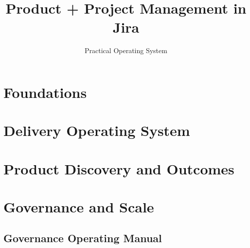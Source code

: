 \documentclass[11pt]{book}
\title{Product + Project Management in Jira}
\author{Practical Operating System}
\date{}
\begin{document}
\maketitle
\tableofcontents

\part{Foundations}





\part{Delivery Operating System}






\part{Product Discovery and Outcomes}






\part{Governance and Scale}





\appendix
\chapter*{Governance Operating Manual}

\end{document}
